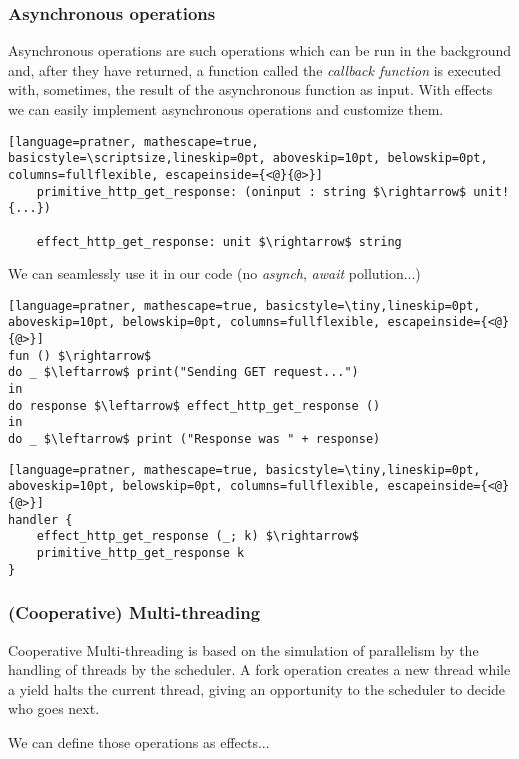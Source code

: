 \documentclass[t]{beamer}
\begin{document}
\begin{frame}[fragile]
	\frametitle{Asynchronous operations}
	Asynchronous operations are such operations which can be run in the background and, after they have returned, a function called the \textit{callback function} is executed with, sometimes, the result of the asynchronous function as input.
	With effects we can easily implement asynchronous operations and customize them.
	

	\begin{lstlisting}[language=pratner, mathescape=true, basicstyle=\scriptsize,lineskip=0pt, aboveskip=10pt, belowskip=0pt, columns=fullflexible, escapeinside={<@}{@>}]
	primitive_http_get_response: (oninput : string $\rightarrow$ unit!{...})
	
	effect_http_get_response: unit $\rightarrow$ string
	\end{lstlisting}  
	We can seamlessly use it in our code (no \textit{asynch}, \textit{await} pollution...)
	
	\begin{multicols}{2}
		\begin{lstlisting}[language=pratner, mathescape=true, basicstyle=\tiny,lineskip=0pt, aboveskip=10pt, belowskip=0pt, columns=fullflexible, escapeinside={<@}{@>}]
fun () $\rightarrow$
do _ $\leftarrow$ print("Sending GET request...") 
in
do response $\leftarrow$ effect_http_get_response ()
in
do _ $\leftarrow$ print ("Response was " + response)
		\end{lstlisting}  
		
		\columnbreak
		
		\begin{lstlisting}[language=pratner, mathescape=true, basicstyle=\tiny,lineskip=0pt, aboveskip=10pt, belowskip=0pt, columns=fullflexible, escapeinside={<@}{@>}]
handler {
	effect_http_get_response (_; k) $\rightarrow$
	primitive_http_get_response k
}

		\end{lstlisting}
	\end{multicols}
	
\end{frame}

\begin{frame}[fragile]
	\frametitle{(Cooperative) Multi-threading}
	
	Cooperative Multi-threading is based on the simulation of parallelism by the handling of threads by the scheduler. 
	A \alert{fork} operation creates a new thread while a \alert{yield} halts the current thread, giving an opportunity to the scheduler to decide who goes next.
		
	We can define those operations as effects...	
\end{frame}
\end{document}
